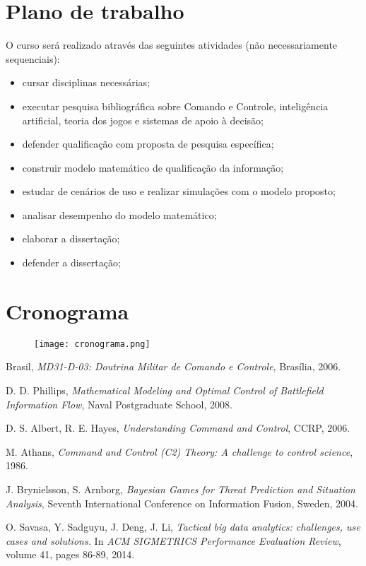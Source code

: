 \documentclass[a4paper,12pt]{article}
\begin{document}
\section{Plano de trabalho}
O curso será realizado através das seguintes atividades (não necessariamente sequenciais):
\begin{itemize}
 \item cursar disciplinas necessárias;
 \item executar pesquisa bibliográfica sobre Comando e Controle, inteligência artificial, teoria dos jogos e sistemas de apoio 
 à decisão;
 \item defender qualificação com proposta de pesquisa específica;
 \item construir modelo matemático de qualificação da informação;
 \item estudar de cenários de uso e realizar simulações com o modelo proposto;
 \item analisar desempenho do modelo matemático;
  \item elaborar a dissertação;
 \item defender a dissertação;
\end{itemize}

\newpage
\section{Cronograma}
\begin{figure}[!hbp]
  \centering
  \texttt{[image: cronograma.png]}
\end{figure}

\begin{thebibliography}{1}

Brasil, \emph{MD31-D-03: Doutrina Militar de Comando e Controle}, Brasília, 2006.

D. D. Phillips, \emph{Mathematical Modeling and Optimal Control of Battlefield Information Flow}, Naval Postgraduate School, 
2008.

D. S. Albert, R. E. Hayes, \emph{Understanding Command and Control}, CCRP, 2006.

M. Athans, \emph{Command and Control (C2) Theory: A challenge to control science}, 1986.

J. Brynielsson, S. Arnborg, \emph{Bayesian Games for Threat Prediction and Situation Analysis}, Seventh International
Conference on Information Fusion, Sweden, 2004.

O. Savasa, Y. Sadguyu, J. Deng, J. Li, \emph{Tactical big data analytics: challenges, use cases and solutions.} In 
\textit{ACM SIGMETRICS Performance Evaluation Review}, volume 41, pages 86-89, 2014.

\end{thebibliography}
\end{document}
